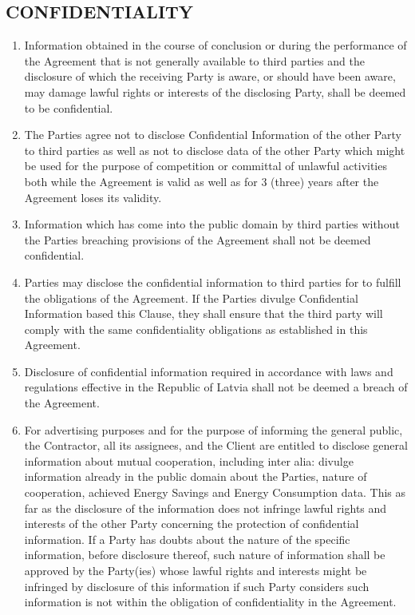 \begin{multicols}{2}
\subsection{CONFIDENTIALITY}
\begin{enumerate}
	\item	Information obtained in the course of conclusion or during the performance of the Agreement that is not generally available to third parties and the disclosure of which the receiving Party is aware, or should have been aware, may damage lawful rights or interests of the disclosing Party, shall be deemed to be confidential.
	\item	The Parties agree not to disclose Confidential Information of the other Party to third parties as well as not to disclose data of the other Party which might be used for the purpose of competition or committal of unlawful activities both while the Agreement is valid as well as for 3 (three) years after the Agreement loses its validity.
	\item	Information which has come into the public domain by third parties without the Parties breaching provisions of the Agreement shall not be deemed confidential.
	\item	Parties may disclose the confidential information to third parties for to fulfill the obligations of the Agreement. If the Parties divulge Confidential Information based this Clause, they shall ensure that the third party will comply with the same confidentiality obligations as established in this Agreement.
	\item	Disclosure of confidential information required in accordance with laws and regulations effective in the Republic of Latvia shall not be deemed a breach of the Agreement.
	\item	For advertising purposes and for the purpose of informing the general public, the Contractor, all its assignees, and the Client are entitled to disclose general information about mutual cooperation, including inter alia: divulge information already in the public domain about the Parties, nature of cooperation, achieved Energy Savings and Energy Consumption data. This as far as the disclosure of the information does not infringe lawful rights and interests of the other Party concerning the protection of confidential information. If a Party has doubts about the nature of the specific information, before disclosure thereof, such nature of information shall be approved by the Party(ies) whose lawful rights and interests might be infringed by disclosure of this information if such Party considers such information is not within the obligation of confidentiality in the Agreement. %

\end{enumerate}
\end{multicols}

